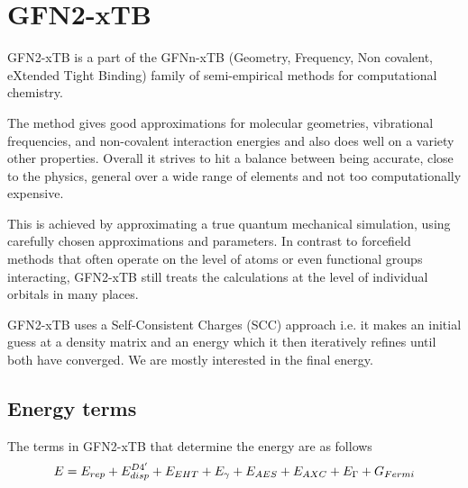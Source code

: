 \chapter{GFN2-xTB}\label{sec:gfn2}
GFN2-xTB is a part of the GFNn-xTB (Geometry, Frequency, Non covalent, eXtended Tight Binding) family of semi-empirical methods for computational chemistry. 

The method gives good approximations for molecular geometries, vibrational frequencies, and non-covalent interaction energies and also does well on a variety other properties. 
Overall it strives to hit a balance between being accurate, close to the physics, general over a wide range of elements and not too computationally expensive.

This is achieved by approximating a true quantum mechanical simulation, using carefully chosen approximations and parameters. 
In contrast to forcefield methods that often operate on the level of atoms or even functional groups interacting, GFN2-xTB still treats the calculations at the level of individual orbitals in many places. 

GFN2-xTB uses a Self-Consistent Charges (SCC) approach i.e. it makes an initial guess at a density matrix and an energy which it then iteratively refines until both have converged. We are mostly interested in the final energy. 

\section{Energy terms}
The terms in GFN2-xTB that determine the energy are as follows
\begin{equation}
E =\E{rep}+\E{disp}^{D4'}+\E{EHT}+\E{\gamma}+\E{AES}+\E{AXC}+\E{\Gamma} + G_{Fermi}
\end{equation}


